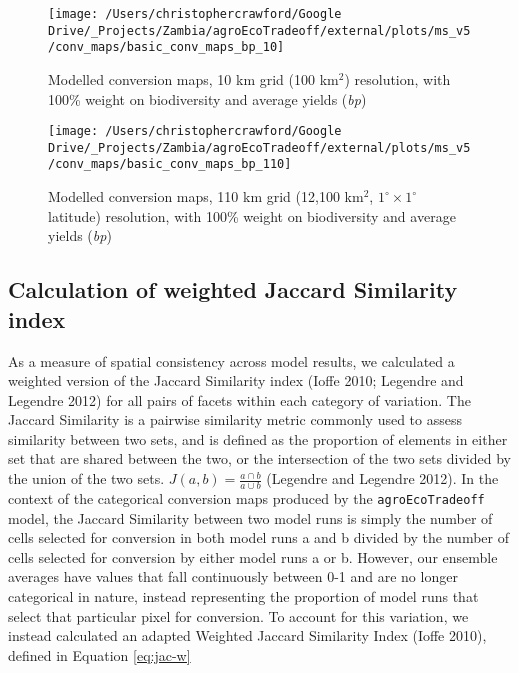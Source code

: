 \documentclass[
]{article}
\begin{document}
\begin{figure}
\texttt{[image: /Users/christophercrawford/Google Drive/\_Projects/Zambia/agroEcoTradeoff/external/plots/ms\_v5/conv\_maps/basic\_conv\_maps\_bp\_10]} \caption{Modelled conversion maps, 10 km grid (100 km\(^2\)) resolution, with 100\% weight on biodiversity and average yields (\emph{bp})}\label{fig:conv-maps-10-bp}
\end{figure}

\begin{figure}
\texttt{[image: /Users/christophercrawford/Google Drive/\_Projects/Zambia/agroEcoTradeoff/external/plots/ms\_v5/conv\_maps/basic\_conv\_maps\_bp\_110]} \caption{Modelled conversion maps, 110 km grid (12,100 km\(^2\), \(1^{\circ}\times1^{\circ}\) latitude) resolution, with 100\% weight on biodiversity and average yields (\emph{bp})}\label{fig:conv-maps-110-bp}
\end{figure}

\hypertarget{calculation-of-weighted-jaccard-similarity-index}{%
\subsection{Calculation of weighted Jaccard Similarity index}\label{calculation-of-weighted-jaccard-similarity-index}}

As a measure of spatial consistency across model results, we calculated a weighted version of the Jaccard Similarity index (Ioffe 2010; Legendre and Legendre 2012) for all pairs of facets within each category of variation. The Jaccard Similarity is a pairwise similarity metric commonly used to assess similarity between two sets, and is defined as the proportion of elements in either set that are shared between the two, or the intersection of the two sets divided by the union of the two sets. \(J(a,b) = \frac{a\cap b}{a\cup b}\) (Legendre and Legendre 2012). In the context of the categorical conversion maps produced by the \texttt{agroEcoTradeoff} model, the Jaccard Similarity between two model runs is simply the number of cells selected for conversion in both model runs a and b divided by the number of cells selected for conversion by either model runs a or b. However, our ensemble averages have values that fall continuously between 0-1 and are no longer categorical in nature, instead representing the proportion of model runs that select that particular pixel for conversion. To account for this variation, we instead calculated an adapted Weighted Jaccard Similarity Index (Ioffe 2010), defined in Equation \eqref{eq:jac-w}
\end{document}
